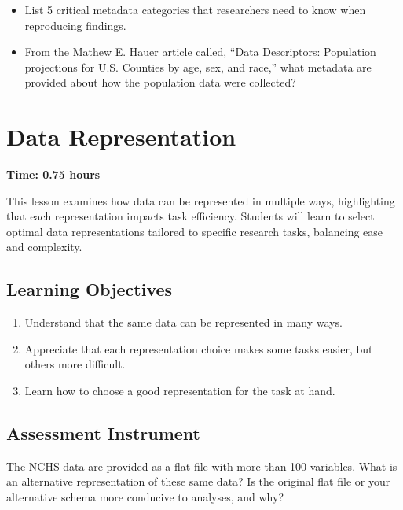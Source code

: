 \begin{itemize}
    \item List 5 critical metadata categories that researchers need to know when reproducing findings.
    \item From the Mathew E. Hauer article called, ``Data Descriptors: Population projections for U.S. Counties by age, sex, and race,'' what metadata are provided about how the population data were collected?
\end{itemize}


\section{Data Representation}
\label{sec:2.3}

\textbf{Time: 0.75 hours}

This lesson examines how data can be represented in multiple ways, highlighting that each representation impacts task efficiency. Students will learn to select optimal data representations tailored to specific research tasks, balancing ease and complexity.

\subsection{Learning Objectives}

\begin{enumerate}
    \item Understand that the same data can be represented in many ways.
    \item Appreciate that each representation choice makes some tasks easier, but others more difficult.
    \item Learn how to choose a good representation for the task at hand.
\end{enumerate}

\subsection{Assessment Instrument}

The NCHS data are provided as a flat file with more than 100 variables. What is an alternative representation of these same data? Is the original flat file or your alternative schema more conducive to analyses, and why?

